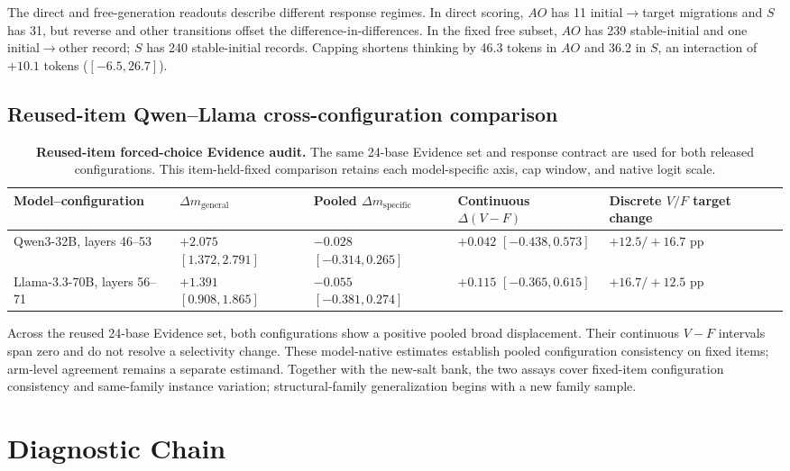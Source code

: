 \documentclass[letterpaper]{article}
\begin{document}
The direct and free-generation readouts describe different response regimes.  In direct scoring, $AO$ has 11 initial$\rightarrow$target migrations and $S$ has 31, but reverse and other transitions offset the difference-in-differences.  In the fixed free subset, $AO$ has 239 stable-initial and one initial$\rightarrow$other record; $S$ has 240 stable-initial records.  Capping shortens thinking by 46.3 tokens in $AO$ and 36.2 in $S$, an interaction of $+10.1$ tokens ($[-6.5,26.7]$).

\subsection{Reused-item Qwen--Llama cross-configuration comparison}

\begin{table}[t]
\centering
\small
\begin{tabular}{L{3.3cm}L{3.0cm}L{3.0cm}L{3.0cm}L{2.4cm}}
\toprule
Model--configuration & $\Delta m_{\mathrm{general}}$ & Pooled $\Delta m_{\mathrm{specific}}$ & Continuous $\Delta(V-F)$ & Discrete $V/F$ target change \\
\midrule
Qwen3-32B, layers 46--53 & $+2.075$ $[1.372,2.791]$ & $-0.028$ $[-0.314,0.265]$ & $+0.042$ $[-0.438,0.573]$ & $+12.5/+16.7$ pp \\
Llama-3.3-70B, layers 56--71 & $+1.391$ $[0.908,1.865]$ & $-0.055$ $[-0.381,0.274]$ & $+0.115$ $[-0.365,0.615]$ & $+16.7/+12.5$ pp \\
\bottomrule
\end{tabular}
\caption{\textbf{Reused-item forced-choice Evidence audit.} The same 24-base Evidence set and response contract are used for both released configurations.  This item-held-fixed comparison retains each model-specific axis, cap window, and native logit scale.}
\label{tab:supp-xm}
\end{table}

Across the reused 24-base Evidence set, both configurations show a positive pooled broad displacement.  Their continuous $V-F$ intervals span zero and do not resolve a selectivity change.  These model-native estimates establish pooled configuration consistency on fixed items; arm-level agreement remains a separate estimand.  Together with the new-salt bank, the two assays cover fixed-item configuration consistency and same-family instance variation; structural-family generalization begins with a new family sample.

\section{Diagnostic Chain}
\label{supp:diagnostics}
\end{document}
